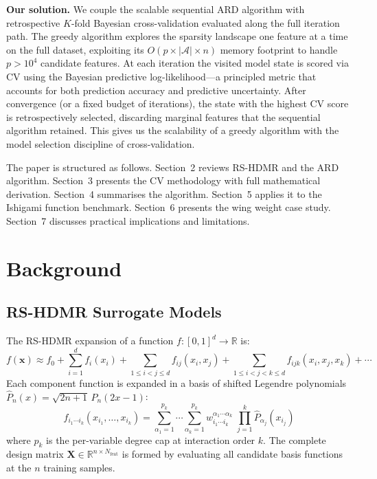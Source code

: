 \documentclass[11pt,a4paper]{article}
\begin{document}
\textbf{Our solution.} We couple the scalable sequential ARD algorithm with retrospective $K$-fold Bayesian cross-validation evaluated along the full iteration path.  The greedy algorithm explores the sparsity landscape one feature at a time on the full dataset, exploiting its $O(p \times |\mathcal{A}| \times n)$ memory footprint to handle $p > 10^4$ candidate features.  At each iteration the visited model state is scored via CV using the Bayesian predictive log-likelihood---a principled metric that accounts for both prediction accuracy and predictive uncertainty.  After convergence (or a fixed budget of iterations), the state with the highest CV score is retrospectively selected, discarding marginal features that the sequential algorithm retained.  This gives us the scalability of a greedy algorithm with the model selection discipline of cross-validation.

The paper is structured as follows. Section~2 reviews RS-HDMR and the ARD algorithm. Section~3 presents the CV methodology with full mathematical derivation. Section~4 summarises the algorithm. Section~5 applies it to the Ishigami function benchmark. Section~6 presents the wing weight case study. Section~7 discusses practical implications and limitations.

\section{Background}

\subsection{RS-HDMR Surrogate Models}

The RS-HDMR expansion of a function $f: [0,1]^d \to \mathbb{R}$ is:
\begin{equation}
f(\mathbf{x}) \approx f_0 + \sum_{i=1}^d f_i(x_i) + \sum_{1 \le i < j \le d} f_{ij}(x_i, x_j) + \sum_{1 \le i < j < k \le d} f_{ijk}(x_i, x_j, x_k) + \cdots
\label{eq:hdmr}
\end{equation}
Each component function is expanded in a basis of shifted Legendre polynomials $\hat{P}_n(x) = \sqrt{2n+1}\, P_n(2x-1)$:
\begin{equation}
f_{i_1\cdots i_k}(x_{i_1},\dots,x_{i_k}) = \sum_{\alpha_1=1}^{p_k} \cdots \sum_{\alpha_k=1}^{p_k} w_{i_1\cdots i_k}^{\alpha_1\cdots\alpha_k} \; \prod_{j=1}^{k} \hat{P}_{\alpha_j}(x_{i_j})
\label{eq:legendre}
\end{equation}
where $p_k$ is the per-variable degree cap at interaction order $k$. The complete design matrix $\mathbf{X} \in \mathbb{R}^{n \times N_{\text{feat}}}$ is formed by evaluating all candidate basis functions at the $n$ training samples.
\end{document}
